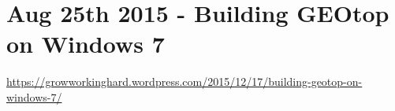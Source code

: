 \section{Aug 25th 2015 - Building GEOtop on Windows 7}\label{sec:20150825}

\url{https://growworkinghard.wordpress.com/2015/12/17/building-geotop-on-windows-7/}












